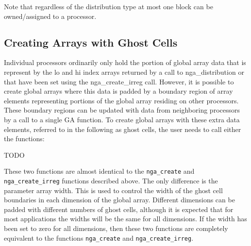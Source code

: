 Note that regardless of the distribution type at most one block can be
owned/assigned to a processor. 

\subsection{Creating Arrays with Ghost Cells}

Individual processors ordinarily only hold the portion of global array data
that is represent by the lo and hi index arrays returned by a call to
nga\_distribution or that have been set using the nga\_create\_irreg call.
However, it is possible to create global arrays where this data is padded by a
boundary region of array elements representing portions of the global array
residing on other processors. These boundary regions can be updated with data
from neighboring processors by a call to a single GA function. To create global
arrays with these extra data elements, referred to in the following as ghost
cells, the user needs to call either the functions:

TODO
%
%
%
%
%
%
%
%
%
%
%
%
%
%
%
%

These two functions are almost identical to the \texttt{nga\_create} and
\texttt{nga\_create\_irreg} functions described above. The only difference is
the parameter array width. This is used to control the width of the ghost cell
boundaries in each dimension of the global array. Different dimensions can be
padded with different numbers of ghost cells, although it is expected that for
most applications the widths will be the same for all dimensions. If the width
has been set to zero for all dimensions, then these two functions are
completely equivalent to the functions \texttt{nga\_create} and
\texttt{nga\_create\_irreg}. 

